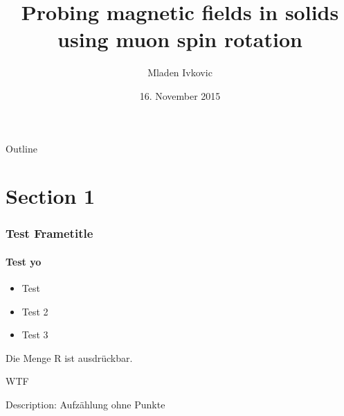\documentclass[11pt]{beamer}
\title{Probing magnetic fields in solids using muon spin rotation}
\author[M. Ivkovic]{
	Mladen Ivkovic
}
\date[16.11.15]{16. November 2015}
\begin{document}
% 
% 
% 
% 
% 


\begin{frame}{}
	\titlepage
\end{frame}

\begin{frame}{Outline}\label{tableofcontents}
   \tableofcontents
\end{frame}







\section{Section 1}
\begin{frame}
	\frametitle{Test Frametitle}
	\framesubtitle{Test yo}

    \begin{itemize}
	\item Test
	\item Test 2
	\item Test 3
    \end{itemize}
    \begin{description}
      \item[${G_3}'$:] Die Menge R ist ausdrückbar.
      \item WTF
      \item [Das hier:] Description: Aufzählung ohne Punkte
    \end{description}
\end{frame}
\end{document}
